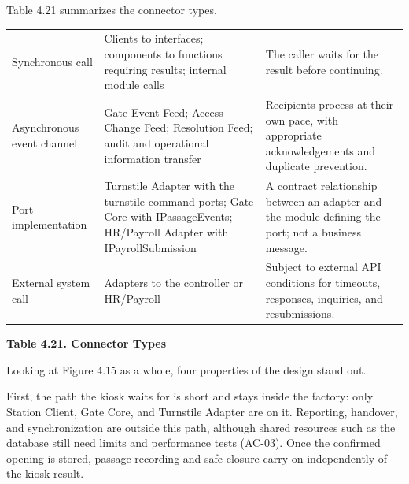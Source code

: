 \noindent\begin{minipage}{\linewidth}
Table 4.21 summarizes the connector types.

\vspace{8pt}
\centering
\begin{tabular}{|>{\raggedright\arraybackslash}p{83.5pt}|>{\raggedright\arraybackslash}p{155.5pt}|>{\raggedright\arraybackslash}p{170.5pt}|}
\hline
\multicolumn{1}{|>{\columncolor{tableheader}\centering\arraybackslash}p{83.5pt}|}{\textbf{Type}} & \multicolumn{1}{>{\columncolor{tableheader}\centering\arraybackslash}p{155.5pt}|}{\textbf{Used In}} & \multicolumn{1}{>{\columncolor{tableheader}\centering\arraybackslash}p{170.5pt}|}{\textbf{Meaning}} \\
\hline
Synchronous call & Clients to interfaces; components to functions requiring results; internal module calls & The caller waits for the result before continuing. \\
\hline
Asynchronous event channel & Gate Event Feed; Access Change Feed; Resolution Feed; audit and operational information transfer & Recipients process at their own pace, with appropriate acknowledgements and duplicate prevention. \\
\hline
Port implementation & Turnstile Adapter with the turnstile command ports; Gate Core with IPassageEvents; HR/Payroll Adapter with IPayrollSubmission & A contract relationship between an adapter and the module defining the port; not a business message. \\
\hline
External system call & Adapters to the controller or HR/Payroll & Subject to external API conditions for timeouts, responses, inquiries, and resubmissions. \\
\hline
\end{tabular}

\vspace{6pt}
\textbf{Table 4.21. Connector Types}
\end{minipage}

\medskip

Looking at Figure 4.15 as a whole, four properties of the design stand out.

First, the path the kiosk waits for is short and stays inside the factory: only Station Client, Gate Core, and Turnstile Adapter are on it. Reporting, handover, and synchronization are outside this path, although shared resources such as the database still need limits and performance tests (AC-03). Once the confirmed opening is stored, passage recording and safe closure carry on independently of the kiosk result.

